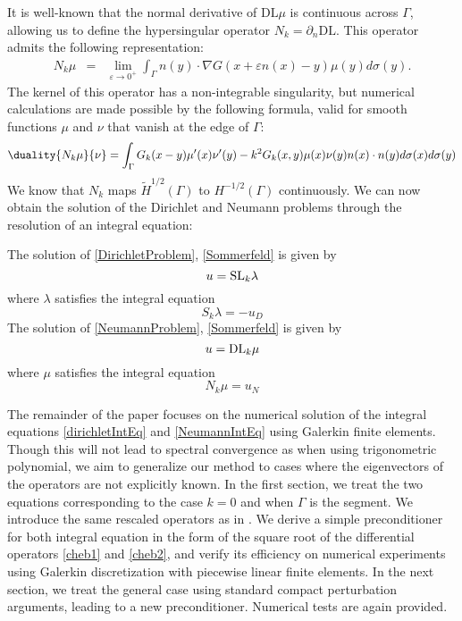 \documentclass[]{article}
\begin{document}
It is well-known that the normal derivative of $\text{DL}\mu$ is continuous across $\Gamma$, allowing us to define the hypersingular operator $N_k = \partial_n \text{DL}$. This operator admits the following representation:
\begin{eqnarray*}
	N_k \mu &=& \lim_{\varepsilon \to 0^+} \int_{\Gamma} n(y) \cdot \nabla G(x + \varepsilon n(x) - y) \mu(y) d\sigma(y).
\end{eqnarray*}
The kernel of this operator has a non-integrable singularity, but numerical calculations are made possible by the following formula, valid for smooth functions $\mu$ and $\nu$ that vanish at the edge of $\Gamma$: 
\[\duality{N_k \mu}{\nu} = \int_{\Gamma} G_k(x-y) \mu'(x) \nu'(y) - k^2 G_k(x,y) \mu(x) \nu(y) n(x) \cdot n(y) d\sigma(x) d\sigma(y)\]
We know that $N_k$ maps $\tilde{H}^{1/2}(\Gamma)$ to $H^{-1/2}(\Gamma)$ continuously.  
We can now obtain the solution of the Dirichlet and Neumann problems through the resolution of an integral equation:
\begin{The} 
	The solution of \eqref{DirichletProblem}, \eqref{Sommerfeld} is given by 
	\[ u = \textup{SL}_k \lambda\]
	where $\lambda$ satisfies the integral equation 
	\begin{equation}
		S_k \lambda = - u_D
		\label{dirichletIntEq}
	\end{equation}
	The solution of \eqref{NeumannProblem}, \eqref{Sommerfeld} is given by 
	\[ u = \textup{DL}_k \mu\]
	where $\mu$ satisfies the integral equation 
	\begin{equation}
		N_k \mu = u_N
		\label{NeumannIntEq}
	\end{equation}
\end{The}

The remainder of the paper focuses on the numerical solution of the integral equations \eqref{dirichletIntEq} and \eqref{NeumannIntEq} using Galerkin finite elements. Though this will not lead to spectral convergence as when using trigonometric polynomial, we aim to generalize our method to cases where the eigenvectors of the operators are not explicitly known. In the first section, we treat the two equations corresponding to the case $k=0$ and when $\Gamma$ is the segment. We introduce the same rescaled operators as in \cite{bruno2012second}. We derive a simple preconditioner for both integral equation in the form of the square root of the differential operators \eqref{cheb1} and \eqref{cheb2}, and verify its efficiency on numerical experiments using Galerkin discretization with piecewise linear finite elements. In the next section, we treat the general case using standard compact perturbation arguments, leading to a new preconditioner. Numerical tests are again provided.
\end{document}
